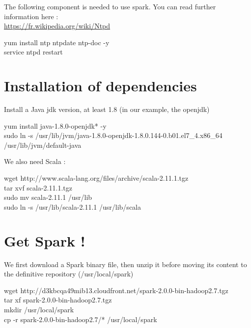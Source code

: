 \documentclass[a4paper]{article}
\begin{document}
\noindent The following component is needed to use spark. You can read further information here :
\\\noindent \url{https://fr.wikipedia.org/wiki/Ntpd}
\begin{center}
\begin{tcolorbox}[width=.8\linewidth,colframe=black!5!white]
 yum install ntp ntpdate ntp-doc -y
\\service ntpd restart
\end{tcolorbox}
\end{center}

\section{Installation of dependencies}

Install a Java jdk version, at least 1.8 (in our example, the openjdk)
\begin{center}
\begin{tcolorbox}[width=.8\linewidth,colframe=black!5!white]
yum install java-1.8.0-openjdk* -y
\\sudo ln -s /usr/lib/jvm/java-1.8.0-openjdk-1.8.0.144-0.b01.el7\_4.x86\_64 /usr/lib/jvm/default-java
\end{tcolorbox}
\end{center}

We also need Scala :
\begin{center}
\begin{tcolorbox}[width=.8\linewidth,colframe=black!5!white]
wget http://www.scala-lang.org/files/archive/scala-2.11.1.tgz
\\ tar xvf scala-2.11.1.tgz
\\ sudo mv scala-2.11.1 /usr/lib
\\ sudo ln -s /usr/lib/scala-2.11.1 /usr/lib/scala
\end{tcolorbox}
\end{center}

\section{Get Spark ! }

We first download a Spark binary file, then unzip it before moving its content to the definitive repository (/usr/local/spark)
\begin{center}
\begin{tcolorbox}[width=.8\linewidth,colframe=black!5!white]
wget http://d3kbcqa49mib13.cloudfront.net/spark-2.0.0-bin-hadoop2.7.tgz
\\tar xf spark-2.0.0-bin-hadoop2.7.tgz
\\mkdir /usr/local/spark
\\cp -r spark-2.0.0-bin-hadoop2.7/* /usr/local/spark
\end{tcolorbox}
\end{center}
\newpage
\end{document}
